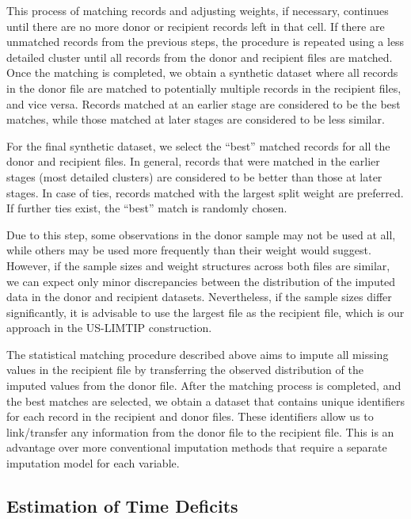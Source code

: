 \documentclass[
  11pt,
]{article}
\begin{document}
This process of matching records and adjusting weights, if necessary,
continues until there are no more donor or recipient records left in
that cell. If there are unmatched records from the previous steps, the
procedure is repeated using a less detailed cluster until all records
from the donor and recipient files are matched. Once the matching is
completed, we obtain a synthetic dataset where all records in the donor
file are matched to potentially multiple records in the recipient files,
and vice versa. Records matched at an earlier stage are considered to be
the best matches, while those matched at later stages are considered to
be less similar.

For the final synthetic dataset, we select the ``best'' matched records
for all the donor and recipient files. In general, records that were
matched in the earlier stages (most detailed clusters) are considered to
be better than those at later stages. In case of ties, records matched
with the largest split weight are preferred. If further ties exist, the
``best'' match is randomly chosen.

Due to this step, some observations in the donor sample may not be used
at all, while others may be used more frequently than their weight would
suggest. However, if the sample sizes and weight structures across both
files are similar, we can expect only minor discrepancies between the
distribution of the imputed data in the donor and recipient datasets.
Nevertheless, if the sample sizes differ significantly, it is advisable
to use the largest file as the recipient file, which is our approach in
the US-LIMTIP construction.

The statistical matching procedure described above aims to impute all
missing values in the recipient file by transferring the observed
distribution of the imputed values from the donor file. After the
matching process is completed, and the best matches are selected, we
obtain a dataset that contains unique identifiers for each record in the
recipient and donor files. These identifiers allow us to link/transfer
any information from the donor file to the recipient file. This is an
advantage over more conventional imputation methods that require a
separate imputation model for each variable.

\subsection{Estimation of Time
Deficits}\label{estimation-of-time-deficits}
\end{document}
